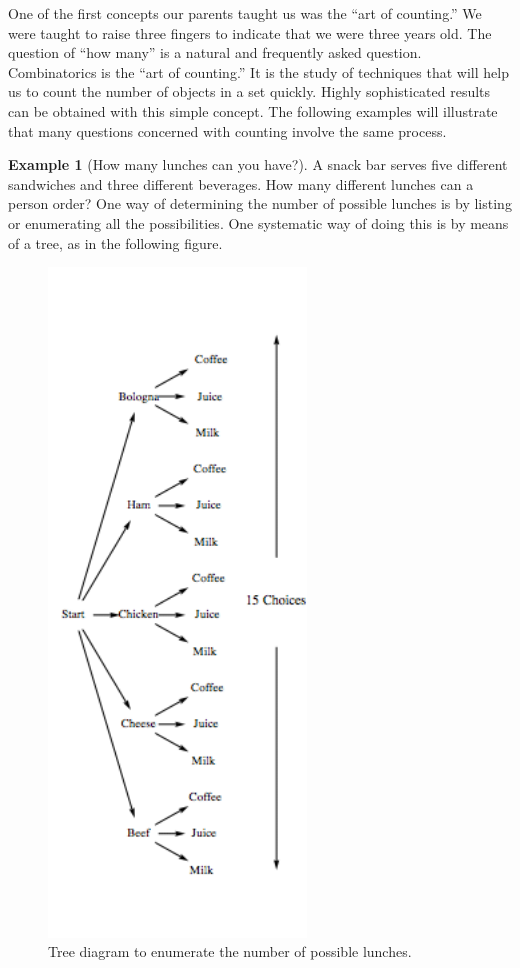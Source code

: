 \documentclass[10pt,]{book}
\theoremstyle{plain}
\theoremstyle{definition}
\newtheorem{example}[theorem]{Example}
\begin{document}
 One of the first concepts our parents taught us was the ``art of counting.'' We were taught to raise three fingers to indicate that we were three years old. The question of ``how many'' is a natural and frequently asked question. Combinatorics is the ``art of counting.'' It is the study of techniques that will help us to count the number of objects in a set quickly. Highly sophisticated results can be obtained with this simple concept. The following examples will illustrate that many questions concerned with counting involve the same process.
%
\begin{example}[How many lunches can you have?]\label{lunch-possibilies1}
A snack bar serves five different sandwiches and three different beverages. How many different lunches can a person order? One way of determining the number of possible lunches is by listing or enumerating all the possibilities. One systematic way of doing this is by means of a tree, as in the following figure.%
\par
            \leavevmode%
\begin{figure}
\centering
\includegraphics[width=194pt,]{images/lunch.gif}\caption{Tree diagram to enumerate the number of possible lunches.
                \label{lunch}}
\end{figure}


\end{example}
\end{document}
